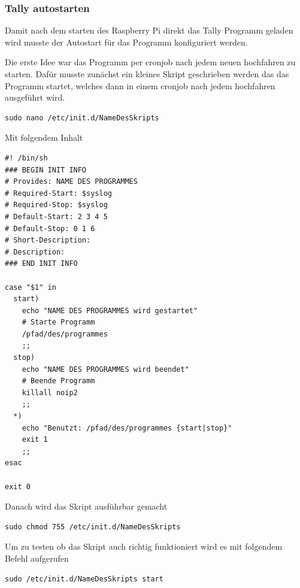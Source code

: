 \documentclass[11pt,a4paper]{article} %
\begin{document}
\subsubsection{Tally autostarten}
Damit nach dem starten des Raspberry Pi direkt das Tally Programm geladen wird musste der Autostart für das Programm konfiguriert werden.
\par
Die erste Idee war das Programm per cronjob nach jedem neuen hochfahren zu starten. Dafür musste zunächst ein kleines Skript geschrieben werden das das Programm startet, welches dann in einem cronjob nach jedem hochfahren ausgeführt wird.
\begin{frame}

\begin{lstlisting}
sudo nano /etc/init.d/NameDesSkripts
\end{lstlisting}
\end{frame}
\newpage
Mit folgendem Inhalt
\begin{frame}

\begin{lstlisting}
#! /bin/sh
### BEGIN INIT INFO
# Provides: NAME DES PROGRAMMES
# Required-Start: $syslog
# Required-Stop: $syslog
# Default-Start: 2 3 4 5
# Default-Stop: 0 1 6
# Short-Description:
# Description:
### END INIT INFO
 
case "$1" in
  start)
    echo "NAME DES PROGRAMMES wird gestartet"
    # Starte Programm
    /pfad/des/programmes
    ;;
  stop)
    echo "NAME DES PROGRAMMES wird beendet"
    # Beende Programm
    killall noip2
    ;;
  *)
    echo "Benutzt: /pfad/des/programmes {start|stop}"
    exit 1
    ;;
esac
 
exit 0
\end{lstlisting}
\end{frame}

Danach wird das Skript ausführbar gemacht
\begin{frame}

\begin{lstlisting}
sudo chmod 755 /etc/init.d/NameDesSkripts
\end{lstlisting}
\end{frame}
Um zu testen ob das Skript auch richtig funktioniert wird es mit folgendem Befehl aufgerufen
\begin{frame}

\begin{lstlisting}
sudo /etc/init.d/NameDesSkripts start
\end{lstlisting}
\end{frame}
\end{document}
